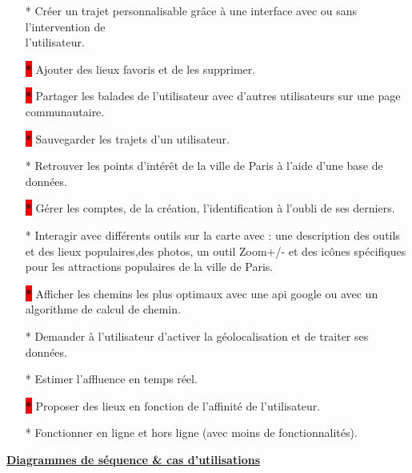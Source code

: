 \documentclass[12pt]{article}
\begin{document}
	\begin{itemize}
		\item[* ] Créer un trajet personnalisable grâce à une interface avec ou sans l’intervention de \\l’utilisateur.
		\item[\colorbox{red}{\textbf{*}} ] Ajouter des lieux favoris et de les supprimer.
		\item[\colorbox{red}{\textbf{*}} ] Partager les balades de l’utilisateur avec d’autres utilisateurs sur une page communautaire.
		\item[\colorbox{red}{\textbf{*}}] Sauvegarder les trajets d’un utilisateur.
		\item[* ] Retrouver les points d’intérêt de la ville de Paris à l’aide d’une base de données.
		\item[\colorbox{red}{\textbf{*}}]  Gérer les comptes, de la création, l’identification à l’oubli de ses derniers.
		\item[* ] Interagir avec différents outils sur la carte avec : une description des outils et des lieux populaires,des photos, un outil Zoom+/- et des icônes spécifiques pour les attractions populaires de la ville de Paris.
		\item[\colorbox{red}{\textbf{*}}] Afficher les chemins les plus optimaux avec une api google ou avec un algorithme de calcul de chemin.
		\item[* ] Demander à l’utilisateur d’activer la géolocalisation et de traiter ses données.
		\item[* ] Estimer l’affluence en temps réel.
		\item[\colorbox{red}{\textbf{*}}] Proposer des lieux en fonction de l’affinité de l’utilisateur.
		\item[* ] Fonctionner en ligne et hors ligne (avec moins de 
		fonctionnalités).
		
		
	\end{itemize}

\textbf{\underline{Diagrammes de séquence \& cas d'utilisations}}
\\
\end{document}

